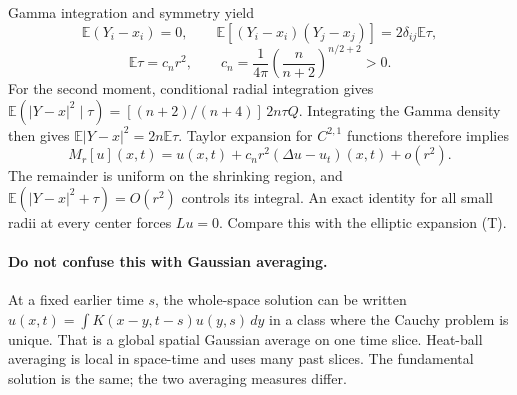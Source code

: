 Gamma integration and symmetry yield
\[
 \mathbb E(Y_i-x_i)=0,\qquad
 \mathbb E[(Y_i-x_i)(Y_j-x_j)]=2\delta_{ij}\mathbb E\tau,
\]
\[
 \mathbb E\tau=c_nr^2,\qquad
 c_n=\frac1{4\pi}\left(\frac n{n+2}\right)^{n/2+2}>0.
\]
For the second moment, conditional radial integration gives
$\mathbb E(|Y-x|^2\mid\tau)
=[(n+2)/(n+4)]\,2n\tau Q$.
Integrating the Gamma density then gives
$\mathbb E|Y-x|^2=2n\mathbb E\tau$.
Taylor expansion for $C^{2,1}$ functions therefore implies
\[
 M_r[u](x,t)=u(x,t)+c_nr^2(\Delta u-u_t)(x,t)+o(r^2).
 \tag{HT}
\]
The remainder is uniform on the shrinking region, and
$\mathbb E(|Y-x|^2+\tau)=O(r^2)$ controls its integral.
An exact identity for all small radii at every center forces $Lu=0$.
Compare this with the elliptic expansion (T).
\Needspace{45mm}

\paragraph{Do not confuse this with Gaussian averaging.}
At a fixed earlier time $s$, the whole-space solution can be written
$u(x,t)=\int K(x-y,t-s)u(y,s)\,dy$ in a class where the Cauchy problem
is unique. That is a global spatial Gaussian average on one time slice.
Heat-ball averaging is local in space-time and uses many past slices.
The fundamental solution is the same; the two averaging measures differ.
